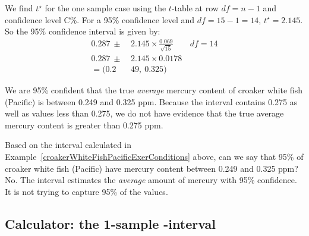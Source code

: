 \begin{examplewrap}
\begin{nexample}
\begin{description}
We find $t^{\star}$ for the one sample case using the $t$-table at row $df = n -1$ and confidence level C\%.  For a 95\% confidence level and $df = 15 - 1 = 14$, $t^{\star} = 2.145$.\\

So the 95\% confidence interval is given by:
\begin{align*}
0.287 \ \pm\  &2.145\times  \frac{0.069}{\sqrt{15}}  \qquad df = 14\\
0.287 \ \pm\  &2.145\times 0.0178 \\
=(0.2&49,\ 0.325)
\end{align*}
\item[\inferencestep{Conclude}]  We are 95\% confident that the true \emph{average} mercury content of croaker white fish (Pacific) is between 0.249 and 0.325 ppm. Because the interval contains 0.275 as well as values less than 0.275, we do not have evidence that the true average mercury content is  greater than 0.275 ppm.
\end{description}
\end{nexample}
\end{examplewrap}


\begin{examplewrap}
\begin{nexample}
{Based on the interval calculated in Example~\ref{croakerWhiteFishPacificExerConditions} above, can we say that 95\% of croaker white fish (Pacific) have mercury content between 0.249 and 0.325 ppm?}
No.  The interval estimates the \emph{average} amount of mercury with 95\% confidence.  It is not trying to capture 95\% of the values.  
\end{nexample}
\end{examplewrap}


\D{\newpage}

\subsection[Calculator: the 1-sample $t$-interval]{Calculator: the 1-sample -interval}
\label{1SampTint}

